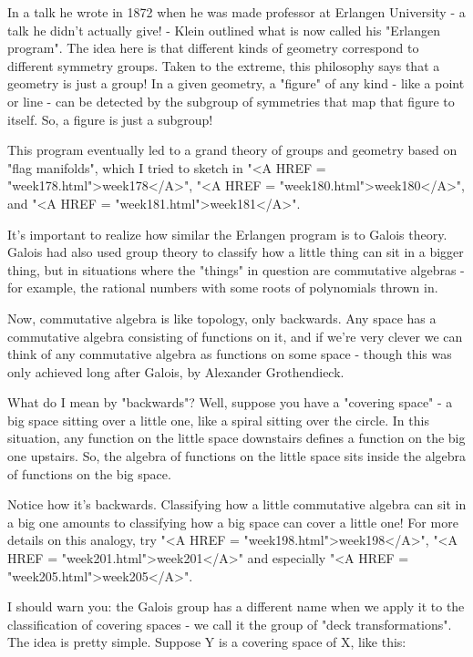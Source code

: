 In a talk he wrote in 1872 when he was made professor at Erlangen 
University - a talk he didn't actually give! - Klein outlined what is now 
called his "Erlangen program".  The idea here is that different 
kinds of 
geometry correspond to different symmetry groups.  Taken to the extreme,
this philosophy says that a geometry is just a group!  In a given geometry, 
a "figure" of any kind - like a point or line - can be detected 
by the 
subgroup of symmetries that map that figure to itself.  So, a figure is 
just a subgroup!  

This program eventually led to a grand theory of groups and geometry based 
on "flag manifolds", which I tried to sketch in "<A HREF = "week178.html">week178</A>", "<A HREF = "week180.html">week180</A>", and 
"<A HREF = "week181.html">week181</A>".  

It's important to realize how similar the Erlangen program is to Galois 
theory.  Galois had also used group theory to classify how a little thing 
can sit in a bigger thing, but in situations where the "things" in question 
are commutative algebras - for example, the rational numbers with some roots 
of polynomials thrown in.

Now, commutative algebra is like topology, only backwards.  Any space has 
a commutative algebra consisting of functions on it, and if we're very 
clever we can think of any commutative algebra as functions on some space - 
though this was only achieved long after Galois, by Alexander Grothendieck. 

What do I mean by "backwards"?  Well, suppose you 
have a "covering
space" - a big space sitting over a little one, like a spiral sitting 
over the circle.  In this situation, any function on the little space 
downstairs defines a function on the big one upstairs.  So, the algebra 
of functions on the little space sits inside the algebra of functions on 
the big space.  

Notice how it's backwards.  Classifying how a little commutative
algebra can sit in a big one amounts to classifying how a big space 
can cover a little one!  For more details on this analogy, 
try "<A HREF = "week198.html">week198</A>", 
"<A HREF = "week201.html">week201</A>" and
especially "<A HREF = "week205.html">week205</A>". 
 
I should warn you: the Galois group has a different name when we apply 
it to the classification of covering spaces - we call it the group 
of "deck transformations".  The idea is pretty simple.  Suppose Y is a 
covering space of X, like this:

